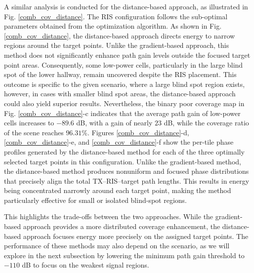 \documentclass{IEEEoj}
\begin{document}
A similar analysis is conducted for the distance-based approach, as illustrated in Fig. \ref{comb_cov_distance}. The RIS configuration follows the sub-optimal parameters obtained from the optimization algorithm. As shown in Fig. \ref{comb_cov_distance}, the distance-based approach directs energy to narrow regions around the target points. Unlike the gradient-based approach, this method does not significantly enhance path gain levels outside the focused target point areas. Consequently, some low-power cells, particularly in the large blind spot of the lower hallway, remain uncovered despite the RIS placement. This outcome is specific to the given scenario, where a large blind spot region exists, however, in cases with smaller blind spot areas, the distance-based approach could also yield superior results. Nevertheless, the binary poor coverage map in Fig. \ref{comb_cov_distance}-c indicates that the average path gain of low-power cells increases to $-89.6$ dB, with a gain of nearly $23$ dB, while the coverage ratio of the scene reaches $96.31\%$. Figures \ref{comb_cov_distance}-d, \ref{comb_cov_distance}-e, and \ref{comb_cov_distance}-f show the per-tile phase profiles generated by the distance-based method for each of the three optimally selected target points in this configuration. Unlike the gradient-based method, the distance-based method produces nonuniform and focused phase distributions that precisely align the total TX–RIS–target path lengths. This results in energy being concentrated narrowly around each target point, making the method particularly effective for small or isolated blind-spot regions.

This highlights the trade-offs between the two approaches. While the gradient-based approach provides a more distributed coverage enhancement, the distance-based approach focuses energy more precisely on the assigned target points. The performance of these methods may also depend on the scenario, as we will explore in the next subsection by lowering the minimum path gain threshold to $-110$ dB to focus on the weakest signal regions.
\end{document}
